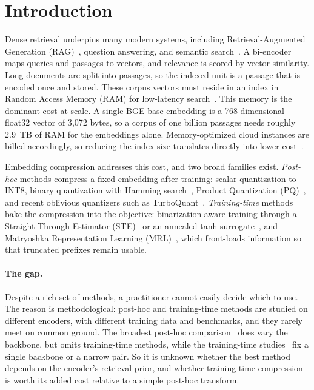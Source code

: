 \section{Introduction}
\label{sec:intro}

Dense retrieval underpins many modern systems, including Retrieval-Augmented
Generation (RAG)~\citep{lewis2020retrieval}, question answering, and
semantic search~\citep{karpukhin2020dense, reimers2019sbert}. A bi-encoder
maps queries and passages to vectors, and relevance is scored by vector
similarity. Long documents are split into passages, so the indexed unit is a
passage that is encoded once and stored. These corpus vectors must reside in an
index in Random Access Memory (RAM) for low-latency
search~\citep{johnson2021billion, malkov2018efficient}. This memory is the dominant cost at scale. A single
BGE-base embedding is a 768-dimensional float32 vector of 3{,}072 bytes, so a
corpus of one billion passages needs roughly 2.9~TB of RAM for the embeddings
alone. Memory-optimized cloud instances are billed accordingly, so reducing
the index size translates directly into lower cost~\citep{aws2024pricing}.

Embedding compression addresses this cost, and two broad families exist.
\emph{Post-hoc} methods compress a fixed embedding after training: scalar
quantization to INT8, binary quantization with Hamming
search~\citep{shakir2024embedding}, Product Quantization
(PQ)~\citep{jegou2010product}, and recent oblivious quantizers such as
TurboQuant~\citep{zandieh2025turboquant}. \emph{Training-time} methods bake
the compression into the objective: binarization-aware training through a
Straight-Through Estimator (STE)~\citep{bengio2013estimating, courbariaux2016bnn}
or an annealed tanh surrogate~\citep{yamada2021efficient}, and Matryoshka
Representation Learning (MRL)~\citep{kusupati2022matryoshka}, which front-loads
information so that truncated prefixes remain usable.

\paragraph{The gap.}
Despite a rich set of methods, a practitioner cannot easily decide which to
use. The reason is methodological: post-hoc and training-time methods are
studied on different encoders, with different training data and benchmarks, and
they rarely meet on common ground. The broadest post-hoc
comparison~\citep{correct2025} does vary the backbone, but omits training-time
methods, while the training-time studies~\citep{qama2025, yamada2021efficient}
fix a single backbone or a narrow pair. So it is unknown whether the best method
depends on the encoder's retrieval prior, and whether training-time compression
is worth its added cost relative to a simple post-hoc transform.

